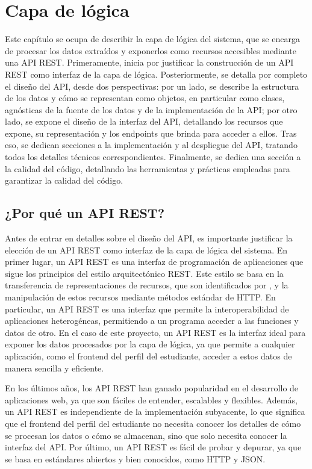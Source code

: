 \chapter{Capa de lógica}

Este capítulo se ocupa de describir la capa de lógica del sistema, que se encarga de procesar los datos extraídos y exponerlos como recursos accesibles mediante una \gls{API REST}. Primeramente, inicia por justificar la construcción de un API REST como interfaz de la capa de lógica. Posteriormente, se detalla por completo el diseño del API, desde dos perspectivas: por un lado, se describe la estructura de los datos y cómo se representan como objetos, en particular como clases, agnósticas de la fuente de los datos y de la implementación de la API; por otro lado, se expone el diseño de la interfaz del API, detallando los recursos que expone, su representación y los endpoints que brinda para acceder a ellos. Tras eso, se dedican secciones a la implementación y al despliegue del API, tratando todos los detalles técnicos correspondientes. Finalmente, se dedica una sección a la calidad del código, detallando las herramientas y prácticas empleadas para garantizar la calidad del código.

\section{¿Por qué un API REST?}

Antes de entrar en detalles sobre el diseño del API, es importante justificar la elección de un API REST como interfaz de la capa de lógica del sistema. En primer lugar, un API REST es una interfaz de programación de aplicaciones que sigue los principios del estilo arquitectónico \gls{REST}. Este estilo se basa en la transferencia de representaciones de recursos, que son identificados por , y la manipulación de estos recursos mediante métodos estándar de \gls{HTTP}. En particular, un API REST es una interfaz que permite la interoperabilidad de aplicaciones heterogéneas, permitiendo a un programa acceder a las funciones y datos de otro. En el caso de este proyecto, un API REST es la interfaz ideal para exponer los datos procesados por la capa de lógica, ya que permite a cualquier aplicación, como el frontend del perfil del estudiante, acceder a estos datos de manera sencilla y eficiente.

En los últimos años, los API REST han ganado popularidad en el desarrollo de aplicaciones web, ya que son fáciles de entender, escalables y flexibles. Además, un API REST es independiente de la implementación subyacente, lo que significa que el frontend del perfil del estudiante no necesita conocer los detalles de cómo se procesan los datos o cómo se almacenan, sino que solo necesita conocer la interfaz del API. Por último, un API REST es fácil de probar y depurar, ya que se basa en estándares abiertos y bien conocidos, como \gls{HTTP} y \gls{JSON}.

